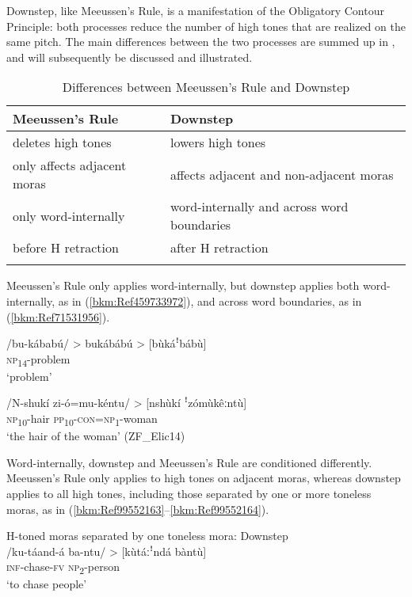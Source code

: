 Downstep, like Meeussen’s Rule, is a manifestation of the Obligatory Contour Principle: both processes reduce the number of high tones that are realized on the same pitch. The main differences between the two processes are summed up in , and will subse\-quently be discussed and illustrated.

\begin{table}
\label{bkm:Ref496783734}\caption{\label{tab:3:2}Differences between Meeussen’s Rule and Downstep}
\begin{tabularx}{\textwidth}{Xl}
\lsptoprule
Meeussen’s Rule & Downstep\\
\midrule
deletes high tones & lowers high tones\\
only affects adjacent moras & affects adjacent and non-adjacent moras\\
only word-internally & word-internally and across word bounda\-ries\\
before H retraction & after H retraction\\
\lspbottomrule
\end{tabularx}
\end{table}

\begin{sloppypar}
Meeussen’s Rule only applies word-internally, but downstep applies both word-internally, as in (\ref{bkm:Ref459733972}), and across word boundaries, as in (\ref{bkm:Ref71531956}).
\end{sloppypar}

\ea
\label{bkm:Ref459733972}
\gll /bu-kábabú/ > bukábábú > [bùkáꜝbábù]\\
\textsc{np}\textsubscript{14}-problem\\
\glt ‘problem’
\z

\ea
\label{bkm:Ref71531956}
\gll /N-shukí  zi-ó=mu-kéntu/ > [nshùkí ꜝzómùkêːntù]\\
\textsc{np}\textsubscript{10}-hair  \textsc{pp}\textsubscript{10}-\textsc{con}=\textsc{np}\textsubscript{1}-woman\\
\glt ‘the hair of the woman’ (ZF\_Elic14)
\z

Word-internally, downstep and Meeussen’s Rule are conditioned differently. Meeussen’s Rule only applies to high tones on adjacent moras, whereas downstep applies to all high tones, including those separated by one or more toneless moras, as in (\ref{bkm:Ref99552163}--\ref{bkm:Ref99552164}).

\ea
\label{bkm:Ref99552163}
H-toned moras separated by one toneless mora: Downstep\\
\gll /ku-táand-á    ba-ntu/ > [kùtáːꜝndá bàntù]\\
\textsc{inf}-chase-\textsc{fv}    \textsc{np}\textsubscript{2}-person\\
\glt ‘to chase people’
\z

